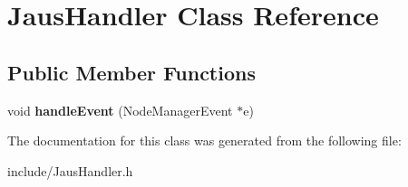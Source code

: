 \hypertarget{class_jaus_handler}{\section{\-Jaus\-Handler \-Class \-Reference}
\label{class_jaus_handler}
}
\subsection*{\-Public \-Member \-Functions}
\begin{DoxyCompactItemize}
\item 
\hypertarget{class_jaus_handler_ac283cc3a9d4415e974fdf3b50b1e8fed}{void {\bfseries handle\-Event} (\-Node\-Manager\-Event $\ast$e)}\label{class_jaus_handler_ac283cc3a9d4415e974fdf3b50b1e8fed}

\end{DoxyCompactItemize}


\-The documentation for this class was generated from the following file\-:\begin{DoxyCompactItemize}
\item 
include/\-Jaus\-Handler.\-h\end{DoxyCompactItemize}

